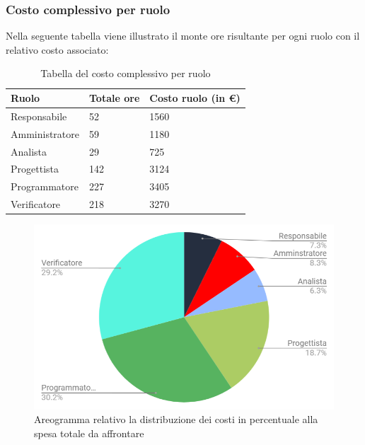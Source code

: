 \subsubsection{Costo complessivo per ruolo}
Nella seguente tabella viene illustrato il monte ore risultante per ogni ruolo con il relativo costo associato:
{
\renewcommand{\arraystretch}{2}
\begin{longtable}{ C{3cm} C{2cm} C{4cm}}
\caption{Tabella del costo complessivo per ruolo}\\
\rowcolor{\primaryColor}

\textcolor{\secondaryColor}{\textbf{Ruolo}} & 
\textcolor{\secondaryColor}{\textbf{Totale ore}} & 
\textcolor{\secondaryColor}{\textbf{Costo ruolo (in \euro{})}}\\	
\endhead
        
Responsabile   &  52 & 1560 \\
Amministratore &  59 & 1180 \\
Analista       &  29 & 725 \\
Progettista    &  142 & 3124 \\
Programmatore  &  227 & 3405 \\
Verificatore   &  218 & 3270 \\
        	
\end{longtable}
}



\begin{figure}[h!]
	\centering
	\caption{Areogramma relativo la distribuzione dei costi in percentuale alla spesa totale da affrontare}
    \includegraphics[scale=0.60]{./src/Preventivo/src/img/TortaPrevCompleto.png}  
\end{figure}


